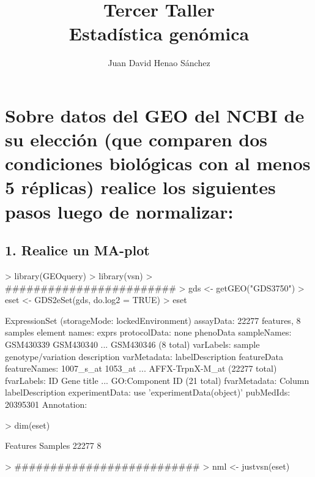 \documentclass{article}
\title{Tercer Taller\\ Estadística genómica}
\author{Juan David Henao Sánchez}
\begin{document}


\maketitle

\section*{Sobre datos del GEO del NCBI de su elección (que comparen dos condiciones biológicas con al menos 5 réplicas) realice los siguientes pasos luego de normalizar:}
\subsection*{1. Realice un MA-plot}


\begin{Schunk}
\begin{Sinput}
> library(GEOquery)
> library(vsn)
> ########################
> gds <- getGEO("GDS3750")
> eset <- GDS2eSet(gds, do.log2 = TRUE)
> eset
\end{Sinput}
\begin{Soutput}
ExpressionSet (storageMode: lockedEnvironment)
assayData: 22277 features, 8 samples 
  element names: exprs 
protocolData: none
phenoData
  sampleNames: GSM430339 GSM430340 ... GSM430346 (8 total)
  varLabels: sample genotype/variation description
  varMetadata: labelDescription
featureData
  featureNames: 1007_s_at 1053_at ... AFFX-TrpnX-M_at (22277 total)
  fvarLabels: ID Gene title ... GO:Component ID (21 total)
  fvarMetadata: Column labelDescription
experimentData: use 'experimentData(object)'
  pubMedIds: 20395301 
Annotation:  
\end{Soutput}
\begin{Sinput}
> dim(eset)
\end{Sinput}
\begin{Soutput}
Features  Samples 
   22277        8 
\end{Soutput}
\begin{Sinput}
> ##########################
> nml <- justvsn(eset)
\end{Sinput}
\end{Schunk}
\end{document}
